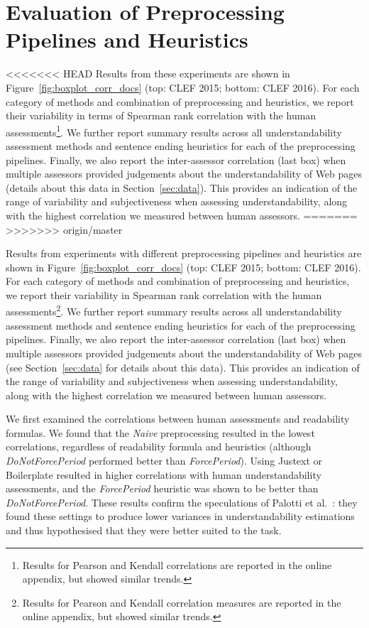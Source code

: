 \section{Evaluation of Preprocessing Pipelines and Heuristics}
\label{sec:which_preprocessing}
<<<<<<< HEAD
Results from these experiments are shown in Figure~\ref{fig:boxplot_corr_docs} (top: CLEF 2015; bottom: CLEF 2016). For each category of methods and combination of preprocessing and heuristics, we report their variability in terms of Spearman rank correlation with the human assessments\footnote{Results for Pearson and Kendall correlations are reported in the online appendix, but showed similar trends.}. We further report summary results across all understandability assessment methods and sentence ending heuristics for each of the preprocessing pipelines. Finally, we also report the inter-assessor correlation (last box) when multiple assessors provided judgements about the understandability of Web pages (details about this data in Section~\ref{sec:data}). This provides an indication of the range of variability and subjectiveness when assessing understandability, along with the highest correlation we measured between human assessors. 
=======
>>>>>>> origin/master

Results from experiments with different preprocessing pipelines and heuristics are shown in Figure~\ref{fig:boxplot_corr_docs} (top: CLEF 2015; bottom: CLEF 2016). For each category of methods and combination of preprocessing and heuristics, we report their variability in Spearman rank correlation with the human assessments\footnote{Results for Pearson and Kendall correlation measures are reported in the online appendix, but showed similar trends.}. We further report summary results across all understandability assessment methods and sentence ending heuristics for each of the preprocessing pipelines. Finally, we also report the inter-assessor correlation (last box) when multiple assessors provided judgements about the understandability of Web pages (see Section~\ref{sec:data} for details about this data). This provides an indication of the range of variability and subjectiveness when assessing understandability, along with the highest correlation we measured between human assessors. 
 
We first examined the correlations between human assessments and readability formulas. We found that the \textit{Naive} preprocessing resulted in the lowest correlations, regardless of readability formula and heuristics (although \textit{DoNotForcePeriod} performed better than \textit{ForcePeriod}). Using Justext or Boilerplate resulted in higher correlations with human understandability assessments, and the \textit{ForcePeriod} heuristic was shown to be better than \textit{DoNotForcePeriod}. These results confirm the speculations of Palotti et al.~\cite{palotti15}: they found these settings to produce lower variances in understandability estimations and thus hypothesised that they were better suited to the task.

